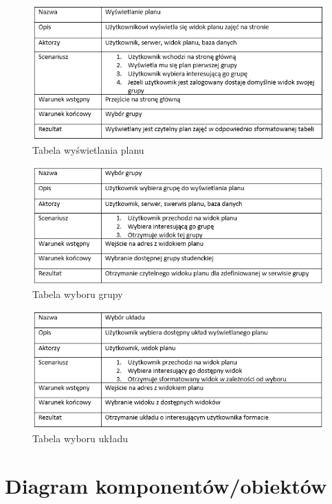 \documentclass[a4paper,11pt]{uzreport}
\begin{document}
     \begin{figure}[ht!]
        \centering
        \includegraphics[width=6in]{pictures/wyswietlanie planu.PNG}
        \caption{Tabela wyświetlania planu}
        \label{fig7}
     \end{figure}
     \begin{figure}[ht!]
        \centering
        \includegraphics[width=6in]{pictures/wybor grupy.PNG}
        \caption{Tabela wyboru grupy}
        \label{fig8}
     \end{figure}
     \begin{figure}[ht!]
        \centering
        \includegraphics[width=6in]{pictures/wybor ukladu.PNG}
        \caption{Tabela wyboru układu}
        \label{fig9}
     \end{figure}


\section{Diagram komponentów/obiektów}
\end{document}
